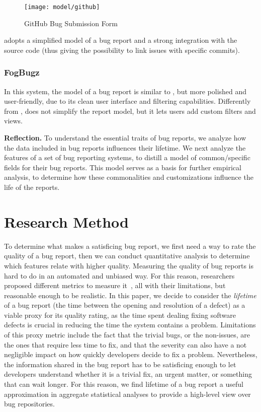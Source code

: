 \begin{figure}[ht]
\centering
  \texttt{[image: model/github]}
  \caption{GitHub Bug Submission Form}
  \label{fig:github-interface}
\end{figure}%

\gth adopts a simplified model of a bug report and a strong integration with the source code (thus giving the possibility to link issues with specific commits).

\subsubsection{FogBugz} In this system, the model of a bug report is similar to \bzilla, but more polished and user-friendly, due to its clean user interface and filtering capabilities. Differently from \gth, \fbz{} does not simplify the report model, but it lets users add custom filters and views.

{\bf Reflection.} To understand the essential traits of bug reports, we analyze how the data included in bug reports influences their lifetime. We next analyze the features of a set of bug reporting systems, to distill a model of common/specific fields for their bug reports. This model serves as a basis for further empirical analysis, to determine how these commonalities and customizations influence the life of the reports.

\section{Research Method} \label{sec:method}

To determine what makes a satisficing bug report, we first need a way to rate the quality of a bug report, then we can conduct quantitative analysis to determine which features relate with higher quality. Measuring the quality of bug reports is hard to do in an automated and unbiased way. For this reason, researchers proposed different metrics to measure it~\cite{Hooi2007}, all with their limitations, but reasonable enough to be realistic. In this paper, we decide to consider the \emph{lifetime} of a bug report (\ie the time between the opening and resolution of a defect) as a viable proxy for its quality rating, as the time spent dealing fixing software defects is crucial in reducing the time the system contains a problem. Limitations of this proxy metric include the fact that the trivial bugs, or the non-issues, are the ones that require less time to fix, and that the severity can also have a not negligible impact on how quickly developers decide to fix a problem. Nevertheless, the information shared in the bug report has to be satisficing enough to let developers understand whether it is a trivial fix, an urgent matter, or something that can wait longer. For this reason, we find lifetime of a bug report a useful approximation in aggregate statistical analyses to provide a high-level view over bug repositories. 

